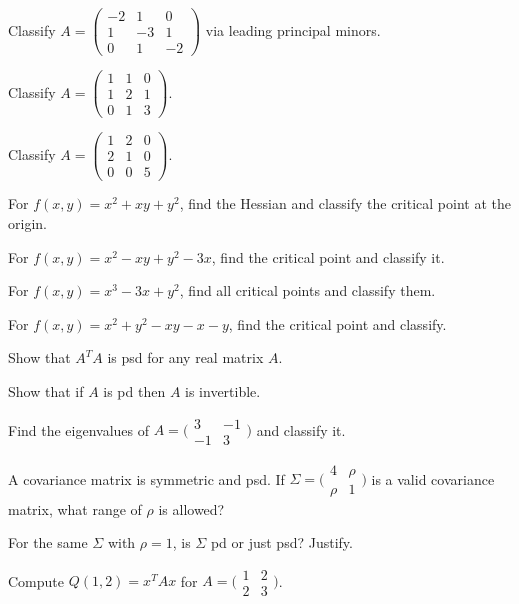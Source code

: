 \begin{problems}
    \item Classify $A = \begin{pmatrix} -2 & 1 & 0 \\ 1 & -3 & 1 \\ 0 & 1 & -2 \end{pmatrix}$ via leading principal minors.
    \item Classify $A = \begin{pmatrix} 1 & 1 & 0 \\ 1 & 2 & 1 \\ 0 & 1 & 3 \end{pmatrix}$.
    \item Classify $A = \begin{pmatrix} 1 & 2 & 0 \\ 2 & 1 & 0 \\ 0 & 0 & 5 \end{pmatrix}$.
    \item For $f(x, y) = x^{2} + x y + y^{2}$, find the Hessian and classify the critical point at the origin.
    \item For $f(x, y) = x^{2} - x y + y^{2} - 3 x$, find the critical point and classify it.
    \item For $f(x, y) = x^{3} - 3 x + y^{2}$, find all critical points and classify them.
    \item For $f(x, y) = x^{2} + y^{2} - x y - x - y$, find the critical point and classify.
    \item Show that $A^{T} A$ is psd for any real matrix $A$.
    \item Show that if $A$ is pd then $A$ is invertible.
    \item Find the eigenvalues of $A = \bigl(\begin{smallmatrix} 3 & -1 \\ -1 & 3 \end{smallmatrix}\bigr)$ and classify it.
    \item A covariance matrix is symmetric and psd. If $\Sigma = \bigl(\begin{smallmatrix} 4 & \rho \\ \rho & 1 \end{smallmatrix}\bigr)$ is a valid covariance matrix, what range of $\rho$ is allowed?
    \item For the same $\Sigma$ with $\rho = 1$, is $\Sigma$ pd or just psd? Justify.
    \item Compute $Q(1, 2) = x^{T} A x$ for $A = \bigl(\begin{smallmatrix} 1 & 2 \\ 2 & 3 \end{smallmatrix}\bigr)$.

\end{problems}
